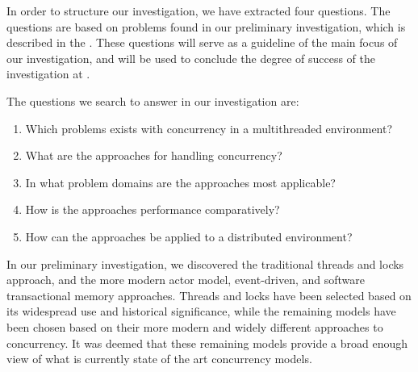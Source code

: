 \makeatletter {}\makeatother
{}
%
In order to structure our investigation, we have extracted four questions. The questions are based on problems found in our preliminary investigation, which is described in the . These questions will serve as a guideline of the main focus of our investigation, and will be used to conclude the degree of success of the investigation at .

The questions we search to answer in our investigation are:
\begin{enumerate}
\item Which problems exists with concurrency in a multithreaded environment? 
\item What are the approaches for handling concurrency?
\item In what problem domains are the approaches most applicable?
\item How is the approaches performance comparatively?
\item How can the approaches be applied to a distributed environment?
\end{enumerate}

In our preliminary investigation, we discovered the traditional threads and locks approach, and the more modern actor model, event-driven, and software transactional memory approaches. Threads and locks have been selected based on its widespread use and historical significance, while the remaining models have been chosen based on their more modern and widely different approaches to concurrency. It was deemed that these remaining models provide a broad enough view of what is currently state of the art concurrency models. 

\worksheetend